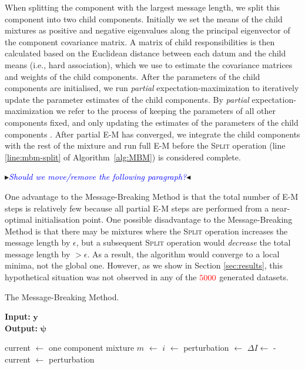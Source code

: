 \documentclass{elsarticle}
\newcommand{\todo}[1]{\textcolor{red}{#1}}
\newcommand{\nbb}[2]{
    \fcolorbox{black}{cyan}{\bfseries\sffamily\scriptsize#1}
    {\sf$\blacktriangleright$\textcolor{blue}{\textit{#2}}$\blacktriangleleft$}
}
\newcommand{\andy}[1]{\nbb{Andy}{#1}}
\newcommand{\vect}[1]{\boldsymbol{\mathbf{#1}}}
\renewcommand{\vec}[1]{\vect{#1}}
\def\datum{y}
\def\data{\vect{\datum}}
\begin{document}
When splitting the component with the largest message length, we split this component into two child components. Initially we 
set the means of the child mixtures as positive and negative eigenvalues along the principal
eigenvector of the component covariance matrix. A matrix of child responsibilities is then
calculated based on the Euclidean distance between each datum and the child means (i.e., hard
association), which we use to estimate the covariance matrices and weights of the child
components. After the parameters of the child components are initialised, we run \emph{partial}
expectation-maximization to iteratively update the parameter estimates of the child components. 
By \emph{partial} expectation-maximization we refer to the process of keeping the parameters of
all other components fixed, and only updating the estimates of the parameters of the child
components \citep{kasarapu2015minimum}. After partial E-M has converged, we integrate the child components with the rest of the mixture and run full E-M before the \textsc{Split} operation (line \ref{line:mbm-split} of Algorithm~\ref{alg:MBM}) is considered complete.

\andy{Should we move/remove the following paragraph?}
One advantage to the Message-Breaking Method is that the total number of E-M steps is relatively few because all partial E-M steps are performed from a near-optimal initialisation point. One possible disadvantage to the Message-Breaking Method is that there may be mixtures where the \textsc{Split} operation increases the message length by $\epsilon$, but a subsequent \textsc{Split} operation would \emph{decrease} the total message length by $>\epsilon$. As a result, the algorithm would converge to a local minima, not the global one. However, as we show in Section \ref{sec:results}, this hypothetical situation was not observed in any of the $\todo{5000}$ generated datasets.

\begin{algorithm}[H]
\caption{The Message-Breaking Method.}
\label{alg:MBM}
{\bf Input:} $\vec{\data}$ \\
{\bf Output:} $\vec{\psi}$  
\begin{algorithmic}[1]
\State current $\leftarrow$ one component mixture
\State $m$ $\leftarrow$ 
\State $i$ $\leftarrow$  
\State perturbation $\leftarrow$  \label{line:mbm-split}
\State $\Delta{}I \leftarrow$  -  
 
\State current $\leftarrow$ perturbation
\EndIf
{} \label{line:end}
\EndWhile
\end{algorithmic}
\end{algorithm}
\end{document}
